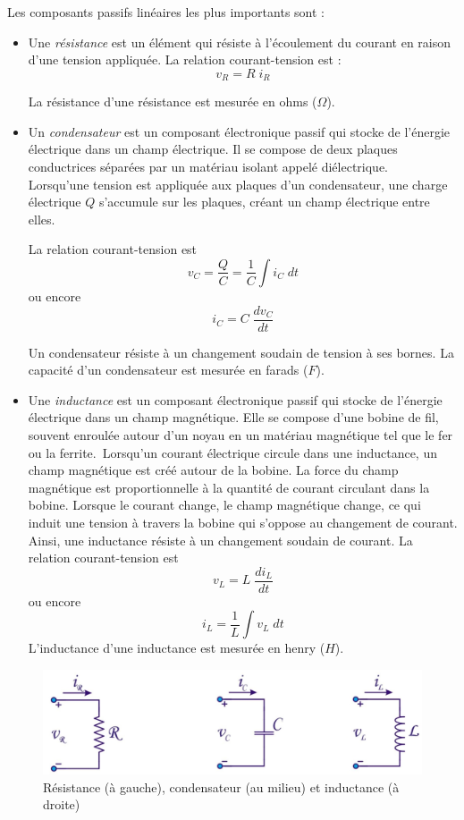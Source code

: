 Les composants passifs linéaires les plus importants sont :
\begin{itemize}
	\item Une \emph{résistance} est un élément qui résiste à l'écoulement du courant en raison d'une tension appliquée. La relation courant-tension est :
	$$v_R = R\;i_R$$
	
	La résistance d'une résistance est mesurée en ohms ($\Omega$).
	\item Un \emph{condensateur} est un composant électronique passif qui stocke de l'énergie électrique dans un champ électrique. Il se compose de deux plaques conductrices séparées par un matériau isolant appelé diélectrique.\\
	Lorsqu'une tension est appliquée aux plaques d'un condensateur, une charge électrique $Q$ s'accumule sur les plaques, créant un champ électrique entre elles.
	
	La relation courant-tension est
	$$v_C  = \frac{Q}{C} = \frac{1}{C} \int i_C \; dt$$
	ou encore 
	$$i_C = C  \; \frac{dv_C}{dt}$$
	
	Un condensateur résiste à un changement soudain de tension à ses bornes. La capacité d'un condensateur est mesurée en farads ($F$).
	\item Une \emph{inductance} est un composant électronique passif qui stocke de l'énergie électrique dans un champ magnétique. Elle se compose d'une bobine de fil, souvent enroulée autour d'un noyau en un matériau magnétique tel que le fer ou la ferrite.\
	Lorsqu'un courant électrique circule dans une inductance, un champ magnétique est créé autour de la bobine. La force du champ magnétique est proportionnelle à la quantité de courant circulant dans la bobine. Lorsque le courant change, le champ magnétique change, ce qui induit une tension à travers la bobine qui s'oppose au changement de courant. Ainsi, une inductance résiste à un changement soudain de courant.
	La relation courant-tension est
	$$
	v_L = L  \;  \frac{di_L}{dt}
	$$
	ou encore
	$$
	i_L = \frac{1}{L}\int v_L  \;  dt
	$$
	L'inductance d'une inductance est mesurée en henry ($H$).
	
\end{itemize}

\begin{figure}[h!]
	\centering
	\includegraphics[width=14cm]{figures/ch00/passive.jpg}
	\caption{Résistance (à gauche), condensateur (au milieu) et inductance (à droite)}
	\label{fig:passive}
\end{figure}

